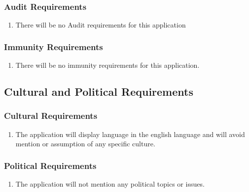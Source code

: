 \documentclass[12pt, titlepage]{article}
\begin{document}
\subsubsection{Audit Requirements}
\label{ssub:audit_requirements}
\begin{enumerate}[{SR}1. ]
	\item There will be no Audit requirements for this application
\end{enumerate}

\subsubsection{Immunity Requirements}
\label{ssub:immunity_requirements}
\begin{enumerate}[{SR}1. ]
	\item There will be no immunity requirements for this application.
\end{enumerate}


\subsection{Cultural and Political Requirements}
\label{sub:cultural_and_political_requirements}

\subsubsection{Cultural Requirements}
\label{ssub:cultural_requirements}
\begin{enumerate}[{CP}1. ]
	\item The application will display language in the english language and will avoid mention or assumption of any specific culture.
\end{enumerate}

\subsubsection{Political Requirements}
\label{ssub:political_requirements}
\begin{enumerate}[{CP}1. ]
	\item The application will not mention any political topics or issues.
\end{enumerate}
\end{document}
